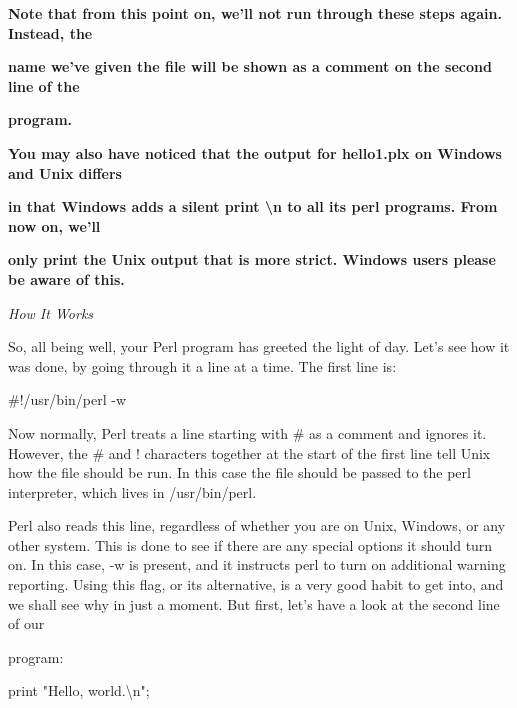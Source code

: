 \documentclass[a4paper,11pt]{book}
\begin{document}
\noindent 

\noindent \textbf{Note that from this point on, we'll not run through these steps again. Instead, the}

\noindent \textbf{name we've given the file will be shown as a comment on the second line of the}

\noindent \textbf{program.}

\noindent 

\noindent \textbf{You may also have noticed that the output for hello1.plx on Windows and Unix differs}

\noindent \textbf{in that Windows adds a silent print \textbackslash n to all its perl programs. From now on, we'll}

\noindent \textbf{only print the Unix output that is more strict. Windows users please be aware of this.}

\noindent 

\noindent 

\noindent \textit{How It Works}

\noindent So, all being well, your Perl program has greeted the light of day. Let's see how it was done, by going through it a line at a time. The first line is:

\noindent 

\noindent 

\noindent \#!/usr/bin/perl -w

\noindent 

\noindent Now normally, Perl treats a line starting with \# as a comment and ignores it. However, the \# and ! characters together at the start of the first line tell Unix how the file should be run. In this case the file should be passed to the perl interpreter, which lives in /usr/bin/perl.

\noindent 

\noindent Perl also reads this line, regardless of whether you are on Unix, Windows, or any other system. This is done to see if there are any special options it should turn on. In this case, -w is present, and it instructs perl to turn on additional warning reporting. Using this flag, or its alternative, is a very good habit to get into, and we shall see why in just a moment. But first, let's have a look at the second line of our

\noindent program:

\noindent 

\noindent 

\noindent print "Hello, world.\textbackslash n";
\end{document}
